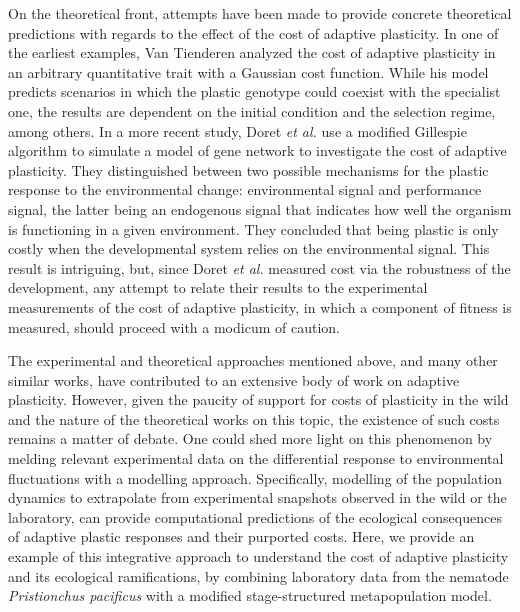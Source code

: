 \documentclass[10pt,letterpaper]{article}
\begin{document}

\hspace{5cm}

On the theoretical front, attempts have been made to provide concrete theoretical predictions with regards to the effect of the cost of adaptive plasticity. In one of the earliest examples, Van Tienderen \cite{Tienderen1991} analyzed the cost of adaptive plasticity in an arbitrary quantitative trait with a Gaussian cost function. While his model predicts scenarios in which the plastic genotype could coexist with the specialist one, the results are dependent on the initial condition and the selection regime, among others. In a more recent study, Doret \emph{et al.} \cite{Doret2020} use a modified Gillespie algorithm to simulate a model of gene network to investigate the cost of adaptive plasticity. They distinguished between two possible mechanisms for the plastic response to the environmental change: environmental signal and performance signal, the latter being an endogenous signal that indicates how well the organism is functioning in a given environment. They concluded that being plastic is only costly when the developmental system relies on the environmental signal. This result is intriguing, but, since Doret \emph{et al.} measured cost via the robustness of the development, any attempt to relate their results to the experimental measurements of the cost of adaptive plasticity, in which a component of fitness is measured, should proceed with a modicum of caution. 

\hspace{5cm}

The experimental and theoretical approaches mentioned above, and many other similar works, have contributed to an extensive body of work on adaptive plasticity. However, given the paucity of support for costs of plasticity in the wild and the nature of the theoretical works on this topic, the existence of such costs remains a matter of debate. One could shed more light on this phenomenon by melding relevant experimental data on the differential response to environmental fluctuations with a modelling approach. Specifically, modelling of the population dynamics to extrapolate from experimental snapshots observed in the wild or the laboratory, can provide computational predictions of the ecological consequences of adaptive plastic responses and their purported costs. Here, we provide an example of this integrative approach to understand the cost of adaptive plasticity and its ecological ramifications, by combining laboratory data from the nematode \emph{Pristionchus pacificus} with a modified stage-structured metapopulation model. 
\end{document}

